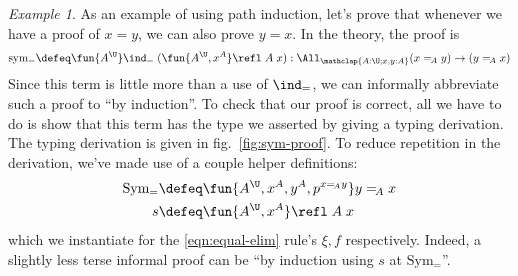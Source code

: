 \documentclass[11pt]{article} %
\theoremstyle{definition}
\theoremstyle{remark}
\newtheorem{example}{Example}
\begin{document}
\begin{example}\label{ex:propeq-symmetry}
As an example of using path induction, let's prove that whenever we have a proof of $x = y$, we can also prove $y = x$.
In the theory, the proof is
$$\mathrm{sym_=} \defeq \fun{A^\U}\ind_=\;(\fun{A^\U, x^A}\refl\;A\;x) : \All_{\mathclap{A:\U; x,y:A}} (x =_{\!A} y) \to (y =_{\!A} x)$$
Since this term is little more than a use of $\ind_=$, we can informally abbreviate such a proof to ``by induction''.
To check that our proof is correct, all we have to do is show that this term has the type we asserted by giving a typing derivation.
The typing derivation is given in fig.~\ref{fig:sym-proof}.
To reduce repetition in the derivation, we've made use of a couple helper definitions:
\begin{align*}
\mathrm{Sym_=} &\defeq \fun{A^\U, x^A,y^A,p^{x =_{\!A} y}}y =_{\!A} x \\
s &\defeq \fun{A^\U, x^A}\refl\;A\;x
\end{align*}
which we instantiate for the \ref{eqn:equal-elim} rule's $\xi, f$ respectively.
Indeed, a slightly less terse informal proof can be ``by induction using $s$ at $\mathrm{Sym_=}$''.


\end{example}
\end{document}
